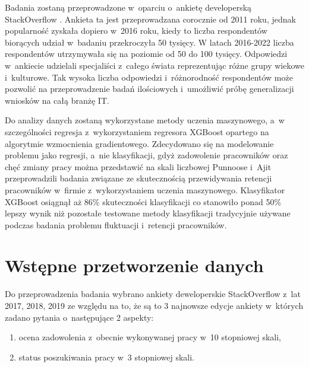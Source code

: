 Badania zostaną przeprowadzone w~oparciu o~ankietę developerską StackOverflow \cite{so-survey-info}.
Ankieta ta jest przeprowadzana corocznie od 2011 roku, jednak popularność zyskała dopiero w~2016 roku, kiedy to liczba respondentów biorących udział w~badaniu przekroczyła 50 tysięcy.
W latach 2016-2022 liczba respondentów utrzymywała się na poziomie od 50 do 100 tysięcy.
Odpowiedzi w~ankiecie udzielali specjaliści z~całego świata reprezentując różne grupy wiekowe i~kulturowe.
Tak wysoka liczba odpowiedzi i~różnorodność respondentów może pozwolić na przeprowadzenie badań ilościowych i~umożliwić próbę generalizacji wniosków na całą branżę IT.


Do analizy danych zostaną wykorzystane metody uczenia maszynowego, a~w szczególności regresja z~wykorzystaniem regresora XGBoost opartego na algorytmie wzmocnienia gradientowego.
Zdecydowano się na modelowanie problemu jako regresji, a~nie klasyfikacji, gdyż zadowolenie pracowników oraz chęć zmiany pracy można przedstawić na skali liczbowej
Punnoose i~Ajit \cite{punnoose-2016} przeprowadzili badania związane ze skutecznością przewidywania retencji pracowników w~firmie z~wykorzystaniem uczenia maszynowego.
Klasyfikator XGBoost osiągnął aż 86\% skuteczności klasyfikacji co stanowiło ponad 50\% lepszy wynik niż pozostałe testowane metody klasyfikacji tradycyjnie używane podczas badania problemu fluktuacji i~retencji pracowników.

\section{Wstępne przetworzenie danych}\label{sec:analysis:preprocessing}
Do przeprowadzenia badania wybrano ankiety deweloperskie StackOverflow z~lat 2017, 2018, 2019 ze względu na to, że są to 3 najnowsze edycje ankiety w~których zadano pytania o~następujące 2 aspekty:
\begin{enumerate}
    \item ocena zadowolenia z~obecnie wykonywanej pracy w~10 stopniowej skali,
    \item status poszukiwania pracy w~3 stopniowej skali.
    \end{enumerate}

